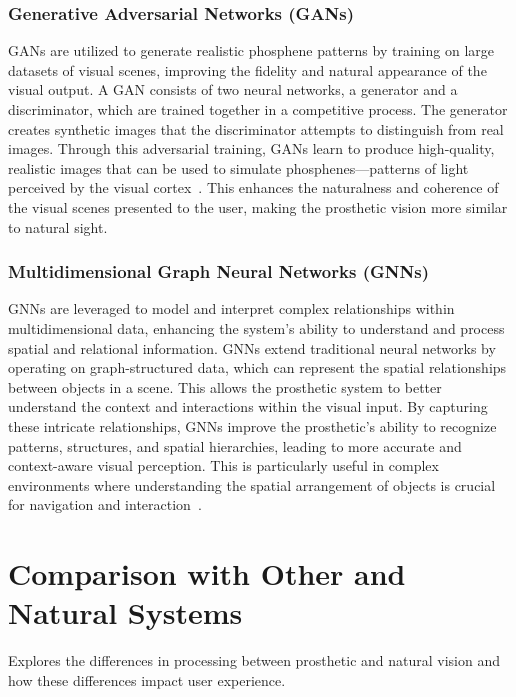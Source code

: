 \documentclass[twocolumn,10pt]{article}
\begin{document}
\subsubsection*{Generative Adversarial Networks (GANs)}
GANs are utilized to generate realistic phosphene patterns by training on large
datasets of visual scenes, improving the fidelity and natural appearance of the
visual output. A GAN consists of two neural networks, a generator and a
discriminator, which are trained together in a competitive process. The
generator creates synthetic images that the discriminator attempts to
distinguish from real images. Through this adversarial training, GANs learn to
produce high-quality, realistic images that can be used to simulate
phosphenes—patterns of light perceived by the visual
cortex~\parencite{goodfellowGenerativeAdversarialNetworks2020,elnabawyPVGANGenerativeAdversarial2022}.
This enhances the naturalness and coherence of the visual scenes presented to
the user, making the prosthetic vision more similar to natural sight.

\subsubsection*{Multidimensional Graph Neural Networks (GNNs)}
GNNs are leveraged to model and interpret complex relationships within
multidimensional data, enhancing the system's ability to understand and process
spatial and relational information. GNNs extend traditional neural networks by
operating on graph-structured data, which can represent the spatial
relationships between objects in a scene. This allows the prosthetic system to
better understand the context and interactions within the visual input. By
capturing these intricate relationships, GNNs improve the prosthetic's ability
to recognize patterns, structures, and spatial hierarchies, leading to more
accurate and context-aware visual perception. This is particularly useful in
complex environments where understanding the spatial arrangement of objects is
crucial for navigation and
interaction~\parencite{subramanianGraphConvolutionalNetworks2020,wuComprehensiveSurveyGraph2021}.

\section{Comparison with Other and Natural Systems}\label{sec:comparison}
Explores the differences in processing between prosthetic and natural vision and
how these differences impact user experience.
\end{document}
